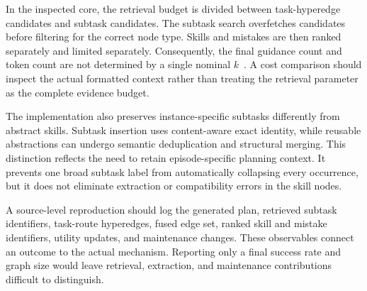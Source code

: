 In the inspected core, the retrieval budget is divided between task-hyperedge candidates and subtask candidates. The subtask search overfetches candidates before filtering for the correct node type. Skills and mistakes are then ranked separately and limited separately. Consequently, the final guidance count and token count are not determined by a single nominal $k$~\cite{repo_hyperskill2026}. A cost comparison should inspect the actual formatted context rather than treating the retrieval parameter as the complete evidence budget.

The implementation also preserves instance-specific subtasks differently from abstract skills. Subtask insertion uses content-aware exact identity, while reusable abstractions can undergo semantic deduplication and structural merging. This distinction reflects the need to retain episode-specific planning context. It prevents one broad subtask label from automatically collapsing every occurrence, but it does not eliminate extraction or compatibility errors in the skill nodes.

A source-level reproduction should log the generated plan, retrieved subtask identifiers, task-route hyperedges, fused edge set, ranked skill and mistake identifiers, utility updates, and maintenance changes. These observables connect an outcome to the actual mechanism. Reporting only a final success rate and graph size would leave retrieval, extraction, and maintenance contributions difficult to distinguish.


